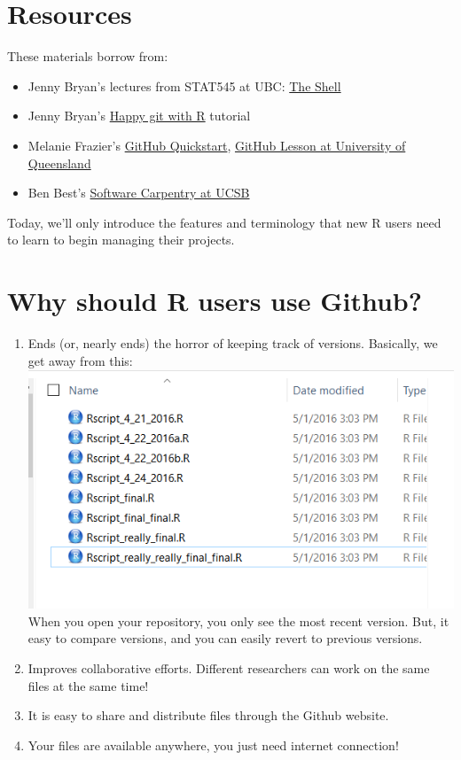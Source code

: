 \documentclass[]{book}
\providecommand{\tightlist}{%
  \setlength{\itemsep}{0pt}\setlength{\parskip}{0pt}}
\begin{document}
\hypertarget{resources-2}{%
\section{Resources}\label{resources-2}}

These materials borrow from:

\begin{itemize}
\tightlist
\item
  Jenny Bryan's lectures from STAT545 at UBC: \href{http://stat545.com/git09_shell.html}{The Shell}
\item
  Jenny Bryan's \href{http://happygitwithr.com}{Happy git with R} tutorial
\item
  Melanie Frazier's \href{https://rawgit.com/nazrug/Quickstart/master/GithubQuickstart.html}{GitHub Quickstart}, \href{https://github.com/OHI-Science/data-science-training/blob/master/github_mel.Rmd}{GitHub Lesson at University of Queensland}
\item
  Ben Best's \href{http://remi-daigle.github.io/2016-04-15-UCSB/git/}{Software Carpentry at UCSB}
\end{itemize}

Today, we'll only introduce the features and terminology that new R users need to learn to begin managing their projects.

\hypertarget{why-should-r-users-use-github}{%
\section{Why should R users use Github?}\label{why-should-r-users-use-github}}

\begin{enumerate}
\def\labelenumi{\arabic{enumi}.}
\tightlist
\item
  Ends (or, nearly ends) the horror of keeping track of versions.
  Basically, we get away from this:
  \includegraphics{img/MessySaves.png}
  When you open your repository, you only see the most recent version. But, it easy to compare versions, and you can easily revert to previous versions.
\item
  Improves collaborative efforts. Different researchers can work on the same files at the same time!
\item
  It is easy to share and distribute files through the Github website.
\item
  Your files are available anywhere, you just need internet connection!
\end{enumerate}
\end{document}
